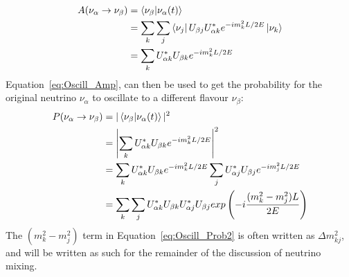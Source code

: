 \begin{align}
    A(\nu_{\alpha}\rightarrow\nu_{\beta}) &= \bra{\nu_{\beta}}\ket{\nu_\alpha(t)} \nonumber \\
    &= \sum_{k}\sum_{j}\bra{\nu_{j}}U_{\beta j}U^{\ast}_{\alpha k}e^{-im_{k}^{2}L/2E}\ket{\nu_{k}} \nonumber \\
    &= \sum_{k}U^{\ast}_{\alpha k}U_{\beta k}e^{-im_{k}^{2}L/2E}   \label{eq:Oscill_Amp}
\end{align}
Equation~\ref{eq:Oscill_Amp}, can then be used to get the probability for the original neutrino $\nu_{\alpha}$ to oscillate to a different flavour $\nu_{\beta}$:
\begin{align}
  P(\nu_{\alpha}\rightarrow\nu_{\beta}) &= |\bra{\nu_{\beta}}\ket{\nu_\alpha(t)}|^2 \nonumber \\
  &= \left|\sum_{k}U^{\ast}_{\alpha k}U_{\beta k}e^{-im_{k}^{2}L/2E}\right|^2 \label{eq:Oscill_Prob1}\\
  &= \sum_{k}U^{\ast}_{\alpha k}U_{\beta k}e^{-im_{k}^{2}L/2E} \sum_{j}U^{\ast}_{\alpha j}U_{\beta j}e^{-im_{j}^{2}L/2E} \nonumber\\
  &= \sum_{k}\sum_{j}U^{\ast}_{\alpha k}U_{\beta k}U^{\ast}_{\alpha j}U_{\beta j}exp\left(-i\frac{(m^{2}_{k}-m^{2}_{j})L}{2E}\right) \label{eq:Oscill_Prob2}
\end{align}
The $(m^{2}_{k}-m^{2}_{j})$ term in Equation~\ref{eq:Oscill_Prob2} is often written as $\Delta m^{2}_{kj}$, and will be written as such for the remainder of the discussion of neutrino mixing. \\

